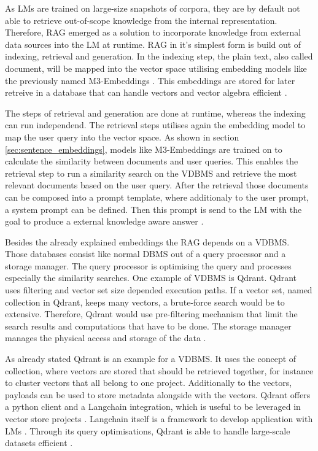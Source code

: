 \documentclass[a4paper,oneside,bibliography=totoc]{scrbook}
\begin{document}
As \acp{LM} are trained on large-size snapshots of corpora, they are by default not able to retrieve out-of-scope knowledge from the internal representation. Therefore, \ac{RAG} emerged as a solution to incorporate knowledge from external data sources into the \ac{LM} at runtime. \ac{RAG} in it's simplest form is build out of indexing, retrieval and generation. In the indexing step, the plain text, also called document, will be mapped into the vector space utilising embedding models like the previously named M3-Embeddings \cite{Gao2024}. This embeddings are stored for later retreive in a database that can handle vectors and vector algebra efficient \cite{Gao2024,Pan2024}.

The steps of retrieval and generation are done at runtime, whereas the indexing can run independend. The retrieval steps utilises again the embedding model to map the user query into the vector space. As shown in section \ref{sec:sentence_embeddings}, models like M3-Embeddings are trained on to calculate the similarity between documents and user queries. This enables the retrieval step to run a similarity search on the \ac{VDBMS} and retrieve the most relevant documents based on the user query. After the retrieval those documents can be composed into a prompt template, where additionaly to the user prompt, a system prompt can be defined. Then this prompt is send to the \ac{LM} with the goal to produce a external knowledge aware answer \cite{Gao2024}.

Besides the already explained embeddings the \ac{RAG} depends on a \ac{VDBMS}. Those databases consist like normal \ac{DBMS} out of a query processor and a storage manager. The query processor is optimising the query and processes especially the similarity searches. One example of \ac{VDBMS} is Qdrant. Qdrant uses filtering and vector set size depended execution paths. If a vector set, named collection in Qdrant, keeps many vectors, a brute-force search would be to extensive. Therefore, Qdrant would use pre-filtering mechanism that limit the search results and computations that have to be done. The storage manager manages the physical access and storage of the data \cite{Pan2024}.

As already stated Qdrant is an example for a \ac{VDBMS}. It uses the concept of collection, where vectors are stored that should be retrieved together, for instance to cluster vectors that all belong to one project. Additionally to the vectors, payloads can be used to store metadata alongside with the vectors. Qdrant offers a python client and a Langchain integration, which is useful to be leveraged in vector store projects \cite{Qdrant2025}. Langchain itself is a framework to develop application with \acp{LM} \cite{LangChain2025d}. Through its query optimisations, Qdrant is able to handle large-scale datasets efficient \cite{Qdrant2025,Pan2024}.
\end{document}
